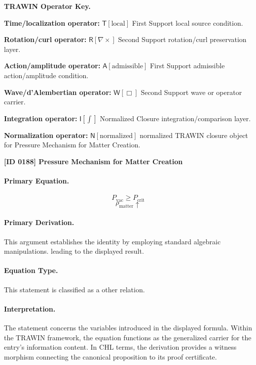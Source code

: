 \par\vspace{0.45\baselineskip}
\noindent\begin{minipage}[t]{\linewidth}
\begingroup
\small
\raggedright
\textbf{TRAWIN Operator Key.}\par
\noindent\textbf{Time/localization operator:} $\mathsf{T}\!\left[\mathrm{local}\right]$ First Support local source condition.\par
\noindent\textbf{Rotation/curl operator:} $\mathsf{R}\!\left[\nabla\times\right]$ Second Support rotation/curl preservation layer.\par
\noindent\textbf{Action/amplitude operator:} $\mathsf{A}\!\left[\mathrm{admissible}\right]$ First Support admissible action/amplitude condition.\par
\noindent\textbf{Wave/d'Alembertian operator:} $\mathsf{W}\!\left[\Box\right]$ Second Support wave or operator carrier.\par
\noindent\textbf{Integration operator:} $\mathsf{I}\!\left[\int\right]$ Normalized Closure integration/comparison layer.\par
\noindent\textbf{Normalization operator:} $\mathsf{N}\!\left[\mathrm{normalized}\right]$ normalized TRAWIN closure object for Pressure Mechanism for Matter Creation.\par
\endgroup
\end{minipage}

\clearpage
\noindent\textbf{[ID 0188] Pressure Mechanism for Matter Creation}\par
\vspace{0.35em}
\paragraph{Primary Equation.}
\[
P_{\mathrm{vac}} \ge P_{\mathrm{crit}}
\]
\[
\rho_{\mathrm{matter}} \uparrow
\]

\paragraph{Primary Derivation.}
This argument establishes the identity by employing standard algebraic manipulations. leading to the displayed result.
\paragraph{Equation Type.}
This statement is classified as a other relation.

\paragraph{Interpretation.}
The statement concerns the variables introduced in the displayed formula. Within the TRAWIN framework, the equation functions as the generalized carrier for the entry’s information content. In CHL terms, the derivation provides a witness morphism connecting the canonical proposition to its proof certificate.

